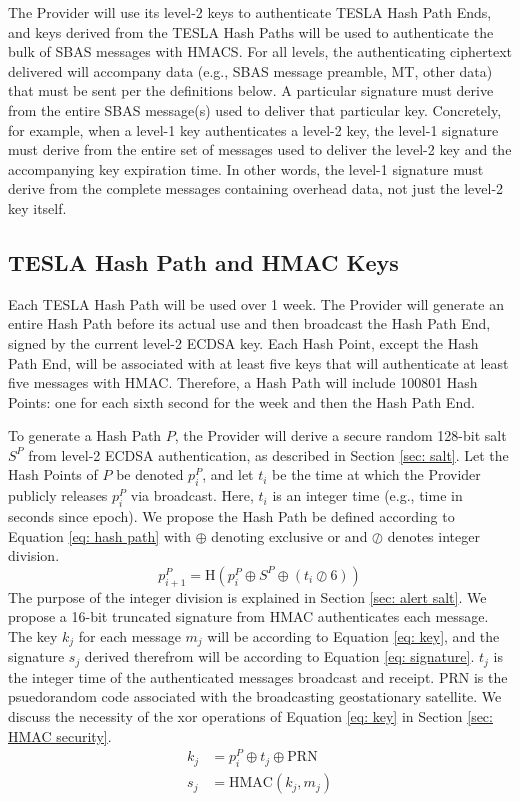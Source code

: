 \documentclass[letterpaper,times]{IONconf/IONconf}
\begin{document}
The Provider will use its level-2 keys to authenticate TESLA Hash Path Ends, and keys derived from the TESLA Hash Paths will be used to authenticate the bulk of SBAS messages with HMACS.
For all levels, the authenticating ciphertext delivered will accompany data (e.g., SBAS message preamble, MT, other data) that must be sent per the definitions below.
A particular signature must derive from the entire SBAS message(s) used to deliver that particular key.
Concretely, for example, when a level-1 key authenticates a level-2 key, the level-1 signature must derive from the entire set of messages used to deliver the level-2 key and the accompanying key expiration time. 
In other words, the level-1 signature must derive from the complete messages containing overhead data, not just the level-2 key itself.

\subsection{TESLA Hash Path and HMAC Keys} \label{sec: TESLA Hash Path and HMAC Keys}

Each TESLA Hash Path will be used over 1 week.
The Provider will generate an entire Hash Path before its actual use and then broadcast the Hash Path End, signed by the current level-2 ECDSA key.
Each Hash Point, except the Hash Path End, will be associated with at least five keys that will authenticate at least five messages with HMAC.
Therefore, a Hash Path will include 100801 Hash Points: one for each sixth second for the week and then the Hash Path End.

To generate a Hash Path $P$, the Provider will derive a secure random 128-bit salt $S^P$ from level-2 ECDSA authentication, as described in Section \ref{sec: salt}.
Let the Hash Points of $P$ be denoted $p^P_i$, and let $t_i$ be the time at which the Provider publicly releases $p^P_i$ via broadcast.
Here, $t_i$ is an integer time (e.g., time in seconds since epoch).
We propose the Hash Path be defined according to Equation \eqref{eq: hash path} with $\oplus$ denoting exclusive or and $\oslash$ denotes integer division.
\begin{equation}\label{eq: hash path}
p^P_{i+1} = \textrm{H} \left(p^P_i \oplus S^P \oplus (t_i \oslash 6) \right)
\end{equation}
The purpose of the integer division is explained in Section \ref{sec: alert salt}.
We propose a 16-bit truncated signature from HMAC authenticates each message.
The key $k_j$ for each message $m_j$ will be according to Equation \ref{eq: key}, and the signature $s_j$ derived therefrom will be according to Equation \eqref{eq: signature}.
$t_j$ is the integer time of the authenticated messages broadcast and receipt.
PRN is the psuedorandom code associated with the broadcasting geostationary satellite.
We discuss the necessity of the xor operations of Equation \eqref{eq: key} in Section \ref{sec: HMAC security}.
\begin{align} 
k_j &= p^P_i \oplus t_j \oplus \textrm{PRN} \label{eq: key} \\
s_j &= \textrm{HMAC}(k_j, m_j) \label{eq: signature}
\end{align}
\end{document}
